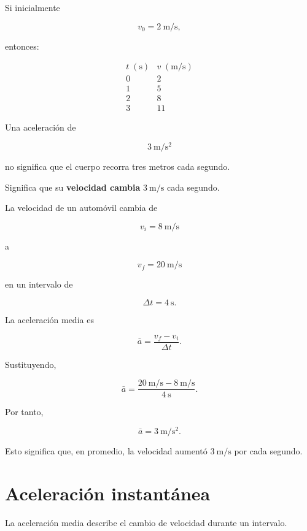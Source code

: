 Si inicialmente

\[ v_0=\SI{2}{\meter\per\second}, \]

entonces:

\[
\begin{array}{c|c}
t\;(\si{\second}) & v\;(\si{\meter\per\second})\\
\hline
0 & 2\\
1 & 5\\
2 & 8\\
3 & 11
\end{array}
\]

\begin{interpretacion}
Una aceleración de

\[ \SI{3}{\meter\per\second\squared} \]

no significa que el cuerpo recorra tres metros cada segundo.

Significa que su \textbf{velocidad cambia}
\(\SI{3}{\meter\per\second}\) cada segundo.
\end{interpretacion}


\begin{ejemplo}

La velocidad de un automóvil cambia de

\[ v_i=\SI{8}{\meter\per\second} \]

a

\[ v_f=\SI{20}{\meter\per\second} \]

en un intervalo de

\[ \Delta t=\SI{4}{\second}. \]

La aceleración media es

\[
\bar{a}
=
\frac{v_f-v_i}{\Delta t}.
\]

Sustituyendo,

\[
\bar{a}
=
\frac{
\SI{20}{\meter\per\second}
-
\SI{8}{\meter\per\second}
}{
\SI{4}{\second}
}.
\]

Por tanto,

\[ \boxed{\bar{a}=\SI{3}{\meter\per\second\squared}}. \]

Esto significa que, en promedio, la velocidad aumentó
\(\SI{3}{\meter\per\second}\) por cada segundo.
\end{ejemplo}


\section{Aceleración instantánea}

La aceleración media describe el cambio de velocidad durante un intervalo.

